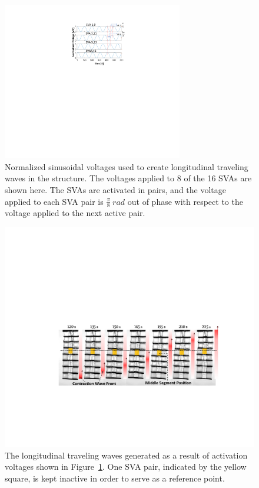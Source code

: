 \begin{figure}[!ht]
\centering
\includegraphics[width=0.7\textwidth]{sineWaves.pdf}
\caption[]{Normalized sinusoidal voltages used to create longitudinal traveling waves in the structure. The voltages applied to 8 of the 16 SVAs are shown here. The SVAs are activated in pairs, and the voltage applied to each SVA pair is $\frac{\pi}{8}~rad$ out of phase with respect to the voltage applied to the next active pair.}
\label{fig:sineWaves}
\end{figure}

\begin{figure}[!ht]
\centering
\includegraphics[width=\textwidth]{peristaltic.pdf}
\caption[]{The longitudinal traveling waves generated as a result of activation voltages shown in Figure~\ref{fig:sineWaves}. One SVA pair, indicated by the yellow square, is kept inactive in order to serve as a reference point. }
\label{fig:peristaltic}
\end{figure}


